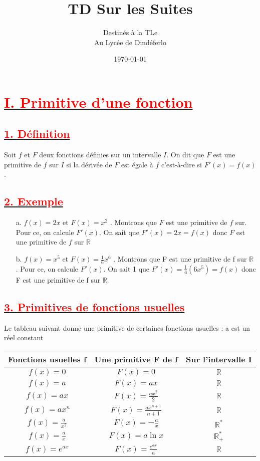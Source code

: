 \documentclass[12pt]{article}
\author{Destinés à la TLe\\Au Lycée de Dindéferlo}
\title{\textbf{TD Sur les Suites}}
\date{\today}
\begin{document}
\maketitle
\newpage
\section*{\underline{\textbf{\textcolor{red}{I. Primitive d’une fonction}}}}
\subsection*{\underline{\textbf{\textcolor{red}{1. Définition}}}}
Soit $f$ et $F$ deux fonctions définies sur un intervalle $I$. On dit que $F$ est une primitive de $f$ sur $I$ si la dérivée de $F$ est égale à $f$ c’est-à-dire si $F'(x) = f(x)$.
\subsection*{\underline{\textbf{\textcolor{red}{2. Exemple}}}}
\begin{itemize}
\item[a.] $f(x) = 2x$ et $F(x) = x^{2}$ . Montrons que $F$ est une primitive de $f$ sur. Pour ce, on calcule $F'(x)$. On sait que $F'(x) = 2x = f(x)$ donc $F$ est une primitive de $f$ sur $\mathbb{R}$
\item[b.] $f(x) = x^{5}$ et $F(x) = \frac{1}{6}x^{6}$ . Montrons que F est une primitive de f sur $\mathbb{R}$ . Pour ce, on calcule $F'(x)$. On sait 1 que $F'(x) =\frac{1}{6}(6x^{5})= f(x)$ donc F est une primitive de f sur $\mathbb{R}$.
\end{itemize}
\subsection*{\underline{\textbf{\textcolor{red}{3. Primitives de fonctions usuelles}}}}
Le tableau suivant donne une primitive de certaines fonctions usuelles : a est un réel constant

\begin{center}
\begin{tabular}{|c|c|c|}
\hline
Fonctions usuelles f & Une primitive F de f &  Sur l’intervalle I   \\
\hline
$f(x) = 0$& $F(x)=0$& $\mathbb{R}$  \\
\hline
$f(x) = a$& $F(x) = ax$  &  $\mathbb{R}$\\
\hline
$f(x) = ax$& $F(x) = \frac{ax^{2}}{2}$& $\mathbb{R}$  \\
\hline
$f(x) = ax^{n}$& $F(x) = \frac{ax^{n+1}}{n+1}$ & $\mathbb{R}$ \\
\hline
$f(x) = \frac{a}{x^{2}}$& $F(x) = -\frac{a}{x}$ & $\mathbb{R}^{*}$ \\
\hline
$f(x) = \frac{a}{x}$& $F(x) = a\ln x$ & $\mathbb{R}^{*}_{+}$ \\
\hline
$f(x) = e^{ax}$& $F(x) = \frac{e^{ax}}{a}$ & $\mathbb{R}$ \\
\hline
\end{tabular}
\end{center}
\end{document}
